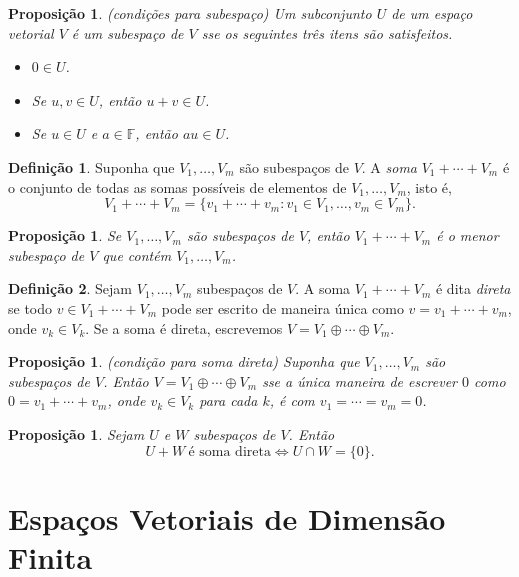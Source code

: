 \documentclass[12pt]{article}
\theoremstyle{plain}
\newtheorem{prop}[thm]{Proposição}
\theoremstyle{definition}
\newtheorem{defn}{Definição}[section]
\theoremstyle{remark}
\begin{document}
\begin{prop} (condições para subespaço)
    Um subconjunto \(U\) de um espaço vetorial \(V\) é um subespaço de \(V\) sse os seguintes três itens são satisfeitos.
    \begin{itemize}
        \item \(0 \in U\).
        \item Se \(u, v \in U\), então \(u + v \in U\).
        \item Se \(u \in U\) e \(a \in \mathbb{F}\), então \(au \in U\).
    \end{itemize}
\end{prop}

\begin{defn}
    Suponha que \(V_1,\ldots,V_m\) são subespaços de \(V\). A \emph{soma} \(V_1 + \cdots + V_m\) é o conjunto de todas as somas possíveis de elementos de \(V_1, \ldots, V_m\), isto é,
    \[
        V_1 + \cdots + V_m = \{v_1 + \cdots + v_m : v_1 \in V_1, \ldots, v_m \in V_m\}.
    \]
\end{defn}

\begin{prop}
    Se \(V_1, \ldots, V_m\) são subespaços de \(V\), então \(V_1 + \cdots + V_m\) é o menor subespaço de \(V\) que contém \(V_1, \ldots, V_m\).
\end{prop}

\begin{defn}
    Sejam \(V_1, \ldots, V_m\) subespaços de \(V\). A soma \(V_1 + \cdots + V_m\) é dita \emph{direta} se todo \(v \in V_1 + \cdots + V_m\) pode ser escrito de maneira única como \(v = v_1 + \cdots + v_m\), onde \(v_k \in V_k\). Se a soma é direta, escrevemos \(V = V_1 \oplus \cdots \oplus V_m\).
\end{defn}

\begin{prop} (condição para soma direta)
    Suponha que \(V_1, \ldots, V_m\) são subespaços de \(V\). Então \(V = V_1 \oplus \cdots \oplus V_m\) sse a única maneira de escrever \(0\) como \(0 = v_1 + \cdots + v_m\), onde \(v_k \in V_k\) para cada \(k\), é com \(v_1 = \cdots = v_m = 0\).
\end{prop}

\begin{prop}
    Sejam \(U\) e \(W\) subespaços de \(V\). Então \[U + W \ \text{é soma direta} \iff U \cap W = \{0\}.\]
\end{prop}

\section{Espaços Vetoriais de Dimensão Finita}
\end{document}
